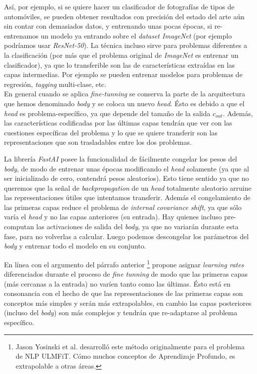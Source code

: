 {Así, por ejemplo, si se quiere hacer un clasificador de fotografías de tipos de automóviles, se pueden obtener resultados con precisión del estado del arte aún sin contar con demasiados datos, y entrenando unas pocas épocas, si re-entrenamos un modelo ya entrando sobre el \textit{dataset ImageNet} (por ejemplo podríamos usar \textit{ResNet-50}). La técnica incluso sirve para problemas diferentes a la clasificación (por más que el problema original de \textit{ImageNet} es entrenar un clasificador), ya que lo transferible son las  de características extraídas en las capas intermedias. Por ejemplo se pueden entrenar modelos para problemas de regresión, \textit{tagging} multi-clase, etc.\\

En general cuando se aplica \textit{fine-tunning} se conserva la parte de la arquitectura que hemos denominado \textit{body} y se coloca un nuevo \textit{head}. Ésto es debido a que el \textit{head} es problema-específico, ya que depende del tamaño de la salida $c_{out}$. Además, las características codificadas por las últimas capas tendrán que ver con las cuestiones específicas del problema y lo que se quiere transferir son las representaciones que son trasladables entre los dos problemas.

La librería \textit{FastAI} posee la funcionalidad de fácilmente congelar los pesos del \textit{body}, de modo de entrenar unas épocas modificando el \textit{head} solamente (ya que al ser inicializado de cero, contendrá pesos aleatorios). Esto tiene sentido ya que no queremos que la señal de \textit{backpropagation} de un \textit{head} totalmente aleatorio arruine las representaciones útiles que intentamos transferir. Además el congelamiento de las primeras capas reduce el problema de \textit{internal covariance shift}, ya que sólo varía el \textit{head} y no las capas anteriores (su entrada). Hay quienes incluso pre-computan las activaciones de salida del \textit{body}, ya que no variarán durante esta fase, para no volverlas a calcular. Luego podemos descongelar los parámetros del \textit{body} y entrenar todo el modelo en su conjunto. \cite{fastbook}

En línea con el argumento del párrafo anterior \cite{discriminative-lr}\footnote{Jason Yosinski et al. desarrolló este método originalmente para el problema de NLP ULMFiT. Cómo muchos conceptos de Aprendizaje Profundo, es extrapolable a otras áreas.} propone asignar \textit{learning rates} diferenciados durante el proceso de \textit{fine tunning} de modo que las primeras capas (más cercanas a la entrada) no varíen tanto como las últimas. Ésto está en consonancia con el hecho de que las representaciones de las primeras capas son conceptos más simples y serán más extrapolables, en cambio las capas posteriores (incluso del \textit{body}) son más complejos y tendrán que re-adaptarse al problema específico.


}

